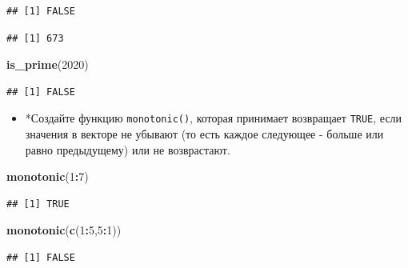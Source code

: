 \documentclass[]{book}
\newenvironment{Shaded}{\begin{snugshade}}{\end{snugshade}}
\newcommand{\KeywordTok}[1]{\textcolor[rgb]{0.13,0.29,0.53}{\textbf{#1}}}
\newcommand{\DecValTok}[1]{\textcolor[rgb]{0.00,0.00,0.81}{#1}}
\newcommand{\CommentTok}[1]{\textcolor[rgb]{0.56,0.35,0.01}{\textit{#1}}}
\newcommand{\OperatorTok}[1]{\textcolor[rgb]{0.81,0.36,0.00}{\textbf{#1}}}
\newcommand{\NormalTok}[1]{#1}
\providecommand{\tightlist}{%
  \setlength{\itemsep}{0pt}\setlength{\parskip}{0pt}}
\begin{document}
\begin{verbatim}
## [1] FALSE
\end{verbatim}

\begin{Shaded}
\end{Shaded}

\begin{verbatim}
## [1] 673
\end{verbatim}

\begin{Shaded}
\begin{Highlighting}[]
\KeywordTok{is_prime}\NormalTok{(}\DecValTok{2020}\NormalTok{)}
\end{Highlighting}
\end{Shaded}

\begin{verbatim}
## [1] FALSE
\end{verbatim}

\begin{itemize}
\tightlist
\item
  *Создайте функцию \texttt{monotonic()}, которая принимает возвращает
  \texttt{TRUE}, если значения в векторе не убывают (то есть каждое
  следующее - больше или равно предыдущему) или не возврастают.
\end{itemize}

\begin{Shaded}
\begin{Highlighting}[]
\KeywordTok{monotonic}\NormalTok{(}\DecValTok{1}\OperatorTok{:}\DecValTok{7}\NormalTok{)}
\end{Highlighting}
\end{Shaded}

\begin{verbatim}
## [1] TRUE
\end{verbatim}

\begin{Shaded}
\begin{Highlighting}[]
\KeywordTok{monotonic}\NormalTok{(}\KeywordTok{c}\NormalTok{(}\DecValTok{1}\OperatorTok{:}\DecValTok{5}\NormalTok{,}\DecValTok{5}\OperatorTok{:}\DecValTok{1}\NormalTok{))}
\end{Highlighting}
\end{Shaded}

\begin{verbatim}
## [1] FALSE
\end{verbatim}
\end{document}
